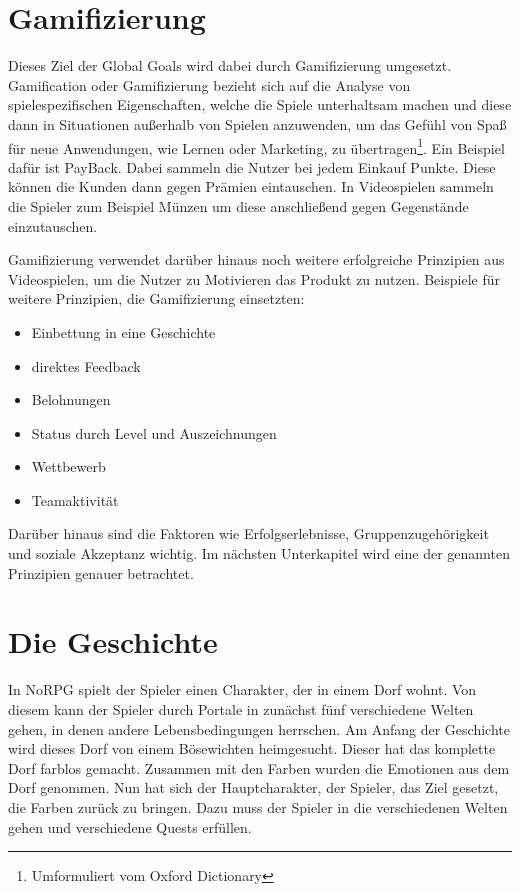\section{Gamifizierung}
Dieses Ziel der Global Goals wird dabei durch Gamifizierung umgesetzt. Gamification oder Gamifizierung bezieht sich auf die Analyse von spielespezifischen Eigenschaften, welche die Spiele unterhaltsam machen und diese dann in Situationen außerhalb von Spielen anzuwenden, um das Gefühl von Spaß für neue Anwendungen, wie Lernen oder Marketing, zu übertragen\footnote{Umformuliert vom Oxford Dictionary}. Ein Beispiel dafür ist PayBack. Dabei sammeln die Nutzer bei jedem Einkauf Punkte. Diese können die Kunden dann gegen Prämien eintauschen. In Videospielen sammeln die Spieler zum Beispiel Münzen um diese anschließend gegen Gegenstände einzutauschen. 

Gamifizierung verwendet darüber hinaus noch weitere erfolgreiche Prinzipien aus Videospielen, um die Nutzer zu Motivieren das Produkt zu nutzen. Beispiele für weitere Prinzipien, die Gamifizierung einsetzten:

\begin{itemize}
\item Einbettung in eine Geschichte
\item direktes Feedback
\item Belohnungen
\item Status durch Level und Auszeichnungen
\item Wettbewerb
\item Teamaktivität
\end{itemize}

Darüber hinaus sind die Faktoren wie Erfolgserlebnisse, Gruppenzugehörigkeit und soziale Akzeptanz wichtig. Im nächsten Unterkapitel wird eine der genannten Prinzipien genauer betrachtet.
	
\section{Die Geschichte}
In NoRPG spielt der Spieler einen Charakter, der in einem Dorf wohnt. Von diesem kann der Spieler durch Portale in zunächst fünf verschiedene Welten gehen, in denen andere Lebensbedingungen herrschen. Am Anfang der Geschichte wird dieses Dorf von einem Bösewichten heimgesucht. Dieser hat das komplette Dorf farblos gemacht. Zusammen mit den Farben wurden die Emotionen aus dem Dorf genommen. Nun hat sich der Hauptcharakter, der Spieler, das Ziel gesetzt, die Farben zurück zu bringen. Dazu muss der Spieler in die verschiedenen Welten gehen und verschiedene Quests erfüllen.

